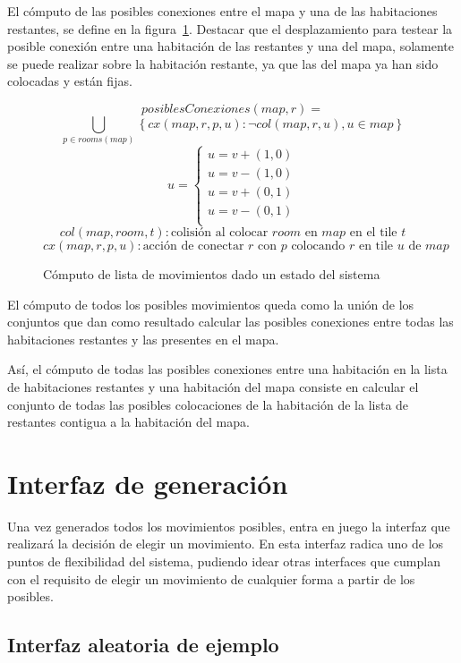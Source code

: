 El cómputo de las posibles conexiones entre el mapa y una de las habitaciones restantes, se define en la figura~\ref{fig:poscons}. Destacar que el desplazamiento para testear la posible conexión entre una habitación de las restantes y una del mapa, solamente se puede realizar sobre la habitación restante, ya que las del mapa ya han sido colocadas y están fijas.

\begin{figure}[h]
	$$posiblesConexiones(map, r) = $$
	$$\bigcup_{p \in rooms(map)}  \left\{ cx(map,r,p,u) : \neg col(map, r, u), u \in map \right\}$$
	$$u = \begin{cases}
		u = v + (1,0) \\
		u = v - (1,0) \\
		u = v + (0,1) \\
		u = v - (0,1) \\
	\end{cases}$$
	$$col(map, room, t) : \text{colisión al colocar $room$ en $map$ en el tile $t$}$$
	$$cx(map,r,p,u) : \text{acción de conectar $r$ con $p$ colocando $r$ en tile $u$ de $map$}$$
\caption{Cómputo de lista de movimientos dado un estado del sistema
\label{fig:poscons}
}
\end{figure}

El cómputo de todos los posibles movimientos queda como la unión de los conjuntos que dan como resultado calcular las posibles conexiones entre todas las habitaciones restantes y las presentes en el mapa.

Así, el cómputo de todas las posibles conexiones entre una habitación en la lista de habitaciones restantes y una habitación del mapa consiste en calcular el conjunto de todas las posibles colocaciones de la habitación de la lista de restantes contigua a la habitación del mapa.


\section{Interfaz de generación}
Una vez generados todos los movimientos posibles, entra en juego la interfaz que realizará la decisión de elegir un movimiento. En esta interfaz radica uno de los puntos de flexibilidad del sistema, pudiendo idear otras interfaces que cumplan con el requisito de elegir un movimiento de cualquier forma a partir de los posibles.


\subsection{Interfaz aleatoria de ejemplo}

